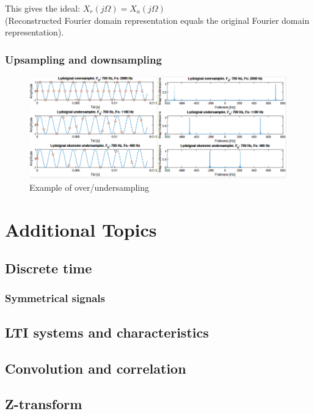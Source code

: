 \documentclass{article}
\begin{document}
This gives the ideal: $X_r (j\Omega) = X_a (j\Omega)$ \\ (Reconstructed Fourier domain representation equals the original Fourier domain representation).

\clearpage
\subsubsection{Upsampling and downsampling}
\begin{figure}[h!]
    \centering
    \includegraphics[width=1\textwidth]{figures/Sampling and reconstruction/sampling_examples.png}
    \caption{Example of over/undersampling}
    \label{fig:sampling_example}
\end{figure}

\section{Additional Topics}
\subsection{Discrete time}
\subsubsection{Symmetrical signals}

\subsection{LTI systems and characteristics}

\subsection{Convolution and correlation}

\subsection{Z-transform}
\end{document}
